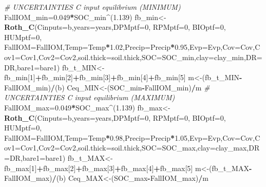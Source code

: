 \documentclass[
  10pt,
  b5paper,
]{book}
\newenvironment{Shaded}{\begin{snugshade}}{\end{snugshade}}
\newcommand{\CommentTok}[1]{\textcolor[rgb]{0.56,0.35,0.01}{\textit{#1}}}
\newcommand{\DataTypeTok}[1]{\textcolor[rgb]{0.13,0.29,0.53}{#1}}
\newcommand{\DecValTok}[1]{\textcolor[rgb]{0.00,0.00,0.81}{#1}}
\newcommand{\FloatTok}[1]{\textcolor[rgb]{0.00,0.00,0.81}{#1}}
\newcommand{\KeywordTok}[1]{\textcolor[rgb]{0.13,0.29,0.53}{\textbf{#1}}}
\newcommand{\NormalTok}[1]{#1}
\newcommand{\OperatorTok}[1]{\textcolor[rgb]{0.81,0.36,0.00}{\textbf{#1}}}
\begin{document}
\begin{Shaded}
\begin{Highlighting}[]
\CommentTok{# UNCERTAINTIES C input equilibrium (MINIMUM)}
\NormalTok{FallIOM_min=}\FloatTok{0.049}\OperatorTok{*}\NormalTok{SOC_min}\OperatorTok{^}\NormalTok{(}\FloatTok{1.139}\NormalTok{) }
\NormalTok{fb_min<-}\KeywordTok{Roth_C}\NormalTok{(}\DataTypeTok{Cinputs=}\NormalTok{b,}\DataTypeTok{years=}\NormalTok{years,}\DataTypeTok{DPMptf=}\DecValTok{0}\NormalTok{, }\DataTypeTok{RPMptf=}\DecValTok{0}\NormalTok{, }\DataTypeTok{BIOptf=}\DecValTok{0}\NormalTok{, }\DataTypeTok{HUMptf=}\DecValTok{0}\NormalTok{, }\DataTypeTok{FallIOM=}\NormalTok{FallIOM,}\DataTypeTok{Temp=}\NormalTok{Temp}\OperatorTok{*}\FloatTok{1.02}\NormalTok{,}\DataTypeTok{Precip=}\NormalTok{Precip}\OperatorTok{*}\FloatTok{0.95}\NormalTok{,}\DataTypeTok{Evp=}\NormalTok{Evp,}\DataTypeTok{Cov=}\NormalTok{Cov,}\DataTypeTok{Cov1=}\NormalTok{Cov1,}\DataTypeTok{Cov2=}\NormalTok{Cov2,}\DataTypeTok{soil.thick=}\NormalTok{soil.thick,}\DataTypeTok{SOC=}\NormalTok{SOC_min,}\DataTypeTok{clay=}\NormalTok{clay_min,}\DataTypeTok{DR=}\NormalTok{DR,}\DataTypeTok{bare1=}\NormalTok{bare1)}
\NormalTok{fb_t_MIN<-fb_min[}\DecValTok{1}\NormalTok{]}\OperatorTok{+}\NormalTok{fb_min[}\DecValTok{2}\NormalTok{]}\OperatorTok{+}\NormalTok{fb_min[}\DecValTok{3}\NormalTok{]}\OperatorTok{+}\NormalTok{fb_min[}\DecValTok{4}\NormalTok{]}\OperatorTok{+}\NormalTok{fb_min[}\DecValTok{5}\NormalTok{]}
\NormalTok{m<-(fb_t_MIN}\OperatorTok{-}\NormalTok{FallIOM_min)}\OperatorTok{/}\NormalTok{(b)}
\NormalTok{Ceq_MIN<-(SOC_min}\OperatorTok{-}\NormalTok{FallIOM_min)}\OperatorTok{/}\NormalTok{m}
\CommentTok{# UNCERTAINTIES C input equilibrium (MAXIMUM)}
\NormalTok{FallIOM_max=}\FloatTok{0.049}\OperatorTok{*}\NormalTok{SOC_max}\OperatorTok{^}\NormalTok{(}\FloatTok{1.139}\NormalTok{) }
\NormalTok{fb_max<-}\KeywordTok{Roth_C}\NormalTok{(}\DataTypeTok{Cinputs=}\NormalTok{b,}\DataTypeTok{years=}\NormalTok{years,}\DataTypeTok{DPMptf=}\DecValTok{0}\NormalTok{, }\DataTypeTok{RPMptf=}\DecValTok{0}\NormalTok{, }\DataTypeTok{BIOptf=}\DecValTok{0}\NormalTok{, }\DataTypeTok{HUMptf=}\DecValTok{0}\NormalTok{, }\DataTypeTok{FallIOM=}\NormalTok{FallIOM,}\DataTypeTok{Temp=}\NormalTok{Temp}\OperatorTok{*}\FloatTok{0.98}\NormalTok{,}\DataTypeTok{Precip=}\NormalTok{Precip}\OperatorTok{*}\FloatTok{1.05}\NormalTok{,}\DataTypeTok{Evp=}\NormalTok{Evp,}\DataTypeTok{Cov=}\NormalTok{Cov,}\DataTypeTok{Cov1=}\NormalTok{Cov1,}\DataTypeTok{Cov2=}\NormalTok{Cov2,}\DataTypeTok{soil.thick=}\NormalTok{soil.thick,}\DataTypeTok{SOC=}\NormalTok{SOC_max,}\DataTypeTok{clay=}\NormalTok{clay_max,}\DataTypeTok{DR=}\NormalTok{DR,}\DataTypeTok{bare1=}\NormalTok{bare1)}
\NormalTok{fb_t_MAX<-fb_max[}\DecValTok{1}\NormalTok{]}\OperatorTok{+}\NormalTok{fb_max[}\DecValTok{2}\NormalTok{]}\OperatorTok{+}\NormalTok{fb_max[}\DecValTok{3}\NormalTok{]}\OperatorTok{+}\NormalTok{fb_max[}\DecValTok{4}\NormalTok{]}\OperatorTok{+}\NormalTok{fb_max[}\DecValTok{5}\NormalTok{]}
\NormalTok{m<-(fb_t_MAX}\OperatorTok{-}\NormalTok{FallIOM_max)}\OperatorTok{/}\NormalTok{(b)}
\NormalTok{Ceq_MAX<-(SOC_max}\OperatorTok{-}\NormalTok{FallIOM_max)}\OperatorTok{/}\NormalTok{m }
\end{Highlighting}
\end{Shaded}
\end{document}
